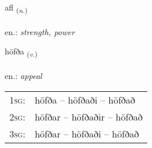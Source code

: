 \documentclass[frontgrid, backgrid]{flacards}\usepackage[]{graphicx}\usepackage[]{xcolor}
\begin{document}
\renewcommand{\flhead}{\vskip5pt \fboxsep=0pt {\small\bfseries\footnotesize Nafnorð | Noun}}
\renewcommand{\fcfoot}{\vskip5pt \fboxsep=0pt \hspace{2pt}{\small\bfseries\footnotesize 2K}}

\renewcommand{\blhead}{\vskip5pt {\small\bfseries\footnotesize Nafnorð | Noun }}
\renewcommand{\bcfoot}{\vskip5pt \hspace{2pt}{\small\bfseries\footnotesize 2K}}


{afl \small{\textsubscript{(\textit{n.})}} \\[1ex] %
\textphonetic{[apl̥]} \\
en.: \emph{strength, power} \\  [2ex]
\renewcommand*{\arraystretch}{0.8}
}

\renewcommand{\flhead}{\vskip5pt \fboxsep=0pt {\small\bfseries\footnotesize Sagnorð | Verb}}
\renewcommand{\fcfoot}{\vskip5pt \fboxsep=0pt \hspace{2pt}{\small\bfseries\footnotesize 2K}}

\renewcommand{\blhead}{\vskip5pt {\small\bfseries\footnotesize Sagnorð | Verb }}
\renewcommand{\bcfoot}{\vskip5pt \hspace{2pt}{\small\bfseries\footnotesize 2K}}


{höfða \small{\textsubscript{(\textit{v.})}} \\[1ex] %
\textphonetic{[hœvða]} \\
en.: \emph{appeal} \\  [2ex]
\renewcommand*{\arraystretch}{0.8}
\begin{tabular}{p{1cm}l}
\textsc{1sg}: & höfða -- höfðaði -- höfðað \\ 
\textsc{2sg}: & höfðar -- höfðaðir -- höfðað \\ 
\textsc{3sg}: & höfðar -- höfðaði -- höfðað \\ 
\end{tabular}
}
\end{document}
